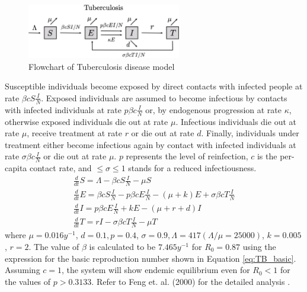 \documentclass{book}
\begin{document}
\begin{figure}
    \centering
    \includegraphics[width = 0.6\textwidth]{Flowcharts/tuberculosis.png}
    \caption{Flowchart of Tuberculosis disease model}
    \label{fig:tuberculosis_flow}
\end{figure}
Susceptible individuals become exposed by direct contacts with infected people at rate $\beta c S\frac{I}{N}$. Exposed individuals are assumed to become infectious by contacts with infected individuals at rate $p \beta c \frac{I}{N}$ or, by endogenous progression at rate $\kappa$, otherwise exposed individuals die out at rate $\mu$. Infectious individuals die out at rate $\mu$, receive treatment at rate $r$ or die out at rate $d$. Finally, individuals under treatment either become infectious again by contact with infected individuals at rate $\sigma \beta c \frac{I}{N}$ or die out at rate $\mu$.
$p$ represents the level of  reinfection, $c$ is the per-capita contact rate, and  $\leq\sigma\leq 1$ stands for a reduced infectiousness.
%
\begin{equation} \label{eq:TB_model}
\begin{array}{l}
\frac{d}{d t} S=\Lambda-\beta c S \frac{I}{N}-\mu S \\
\frac{d}{d t} E=\beta c S \frac{I}{N}-p \beta c E \frac{I}{N}-(\mu+k) E+\sigma \beta c T \frac{I}{N} \\
\frac{d}{d t} I=p \beta c E \frac{I}{N}+k E-(\mu+r+d) I \\
\frac{d}{d t} T=r I-\sigma \beta c T \frac{I}{N}-\mu T
\end{array}
\end{equation}
%
where $\mu=0.016 y^{-1}$, $d=0.1, p=0.4$, $\sigma=0.9, \Lambda=417(\Lambda / \mu=25000)$, $k=0.005$, $r=2$. The value of $\beta$ is calculated to be $7.465 y^{-1}$ for $R_0 = 0.87$ using the expression for the basic reproduction number shown in Equation \ref{eq:TB_basic}. Assuming $c = 1$, the system will show endemic equilibrium even for $R_0<1$ for the values of $p>0.3133$. Refer to Feng et. al. (2000) for the detailed analysis \cite{feng2000model}.

\end{document}
